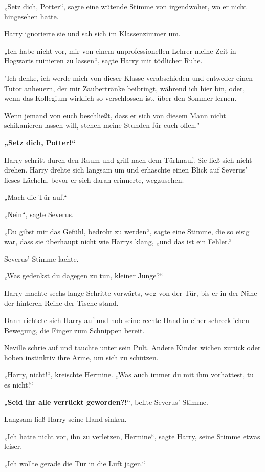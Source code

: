 {„Setz dich, Potter“, sagte eine wütende Stimme von irgendwoher, wo er nicht hingesehen hatte.

Harry ignorierte sie und sah sich im Klassenzimmer um.

„Ich habe nicht vor, mir von einem unprofessionellen Lehrer meine Zeit in Hogwarts ruinieren zu lassen“, sagte Harry mit tödlicher Ruhe.

"Ich denke, ich werde mich von dieser Klasse verabschieden und entweder einen Tutor anheuern, der mir Zaubertränke beibringt, während ich hier bin, oder, wenn das Kollegium wirklich so verschlossen ist, über den Sommer lernen.

Wenn jemand von euch beschließt, dass er sich von diesem Mann nicht schikanieren lassen will, stehen meine Stunden für euch offen."

\textbf{„Setz dich, Potter!“}

Harry schritt durch den Raum und griff nach dem Türknauf. Sie ließ sich nicht drehen. Harry drehte sich langsam um und erhaschte einen Blick auf Severus' fieses Lächeln, bevor er sich daran erinnerte, wegzusehen.

„Mach die Tür auf.“

„Nein“, sagte Severus.

„Du gibst mir das Gefühl, bedroht zu werden“, sagte eine Stimme, die so eisig war, dass sie überhaupt nicht wie Harrys klang, „und das ist ein Fehler.“

Severus' Stimme lachte.

„Was gedenkst du dagegen zu tun, kleiner Junge?“

Harry machte sechs lange Schritte vorwärts, weg von der Tür, bis er in der Nähe der hinteren Reihe der Tische stand.

Dann richtete sich Harry auf und hob seine rechte Hand in einer schrecklichen Bewegung, die Finger zum Schnippen bereit.

Neville schrie auf und tauchte unter sein Pult. Andere Kinder wichen zurück oder hoben instinktiv ihre Arme, um sich zu schützen.

„Harry, nicht!“, kreischte Hermine. „Was auch immer du mit ihm vorhattest, tu es nicht!“

„\textbf{Seid ihr alle verrückt geworden?!}“, bellte Severus' Stimme.

Langsam ließ Harry seine Hand sinken.

„Ich hatte nicht vor, ihn zu verletzen, Hermine“, sagte Harry, seine Stimme etwas leiser.

„Ich wollte gerade die Tür in die Luft jagen.“

}
